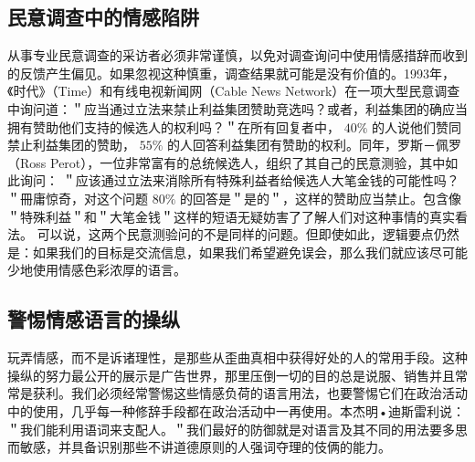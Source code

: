 \subsection{民意调查中的情感陷阱}

从事专业民意调查的采访者必须非常谨慎，以免对调查询问中使用情感措辞而收到的反馈产生偏见。如果忽视这种慎重，调查结果就可能是没有价值的。1993年，《时代》（Time）和有线电视新闻网（Cable News Network）在一项大型民意调查中询问道：＂应当通过立法来禁止利益集团赞助竞选吗？或者，利益集团的确应当拥有赞助他们支持的候选人的权利吗？＂在所有回复者中， $40 \%$ 的人说他们赞同禁止利益集团的赞助， $55 \%$ 的人回答利益集团有赞助的权利。同年，罗斯－佩罗（Ross Perot），一位非常富有的总统候选人，组织了其自己的民意测验，其中如此询问： ＂应该通过立法来消除所有特殊利益者给候选人大笔金钱的可能性吗？＂冊庸惊奇，对这个问题 $80 \%$ 的回答是＂是的＂，这样的赞助应当禁止。包含像＂特殊利益＂和＂大笔金钱＂这样的短语无疑妨害了了解人们对这种事情的真实看法。\cite{perot1993}\cite{timecnn1993} 可以说，这两个民意测验问的不是同样的问题。但即使如此，逻辑要点仍然是：如果我们的目标是交流信息，如果我们希望避免误会，那么我们就应该尽可能少地使用情感色彩浓厚的语言。

\subsection{警惕情感语言的操纵}

玩弄情感，而不是诉诸理性，是那些从歪曲真相中获得好处的人的常用手段。这种操纵的努力最公开的展示是广告世界，那里压倒一切的目的总是说服、销售并且常常是获利。我们必须经常警惕这些情感负荷的语言用法，也要警惕它们在政治活动中的使用，几乎每一种修辞手段都在政治活动中一再使用。本杰明•迪斯雷利说：＂我们能利用语词来支配人。＂我们最好的防御就是对语言及其不同的用法要多思而敏感，并具备识别那些不讲道德原则的人强词夺理的伎俩的能力。

\begin{center}
\end{center} 